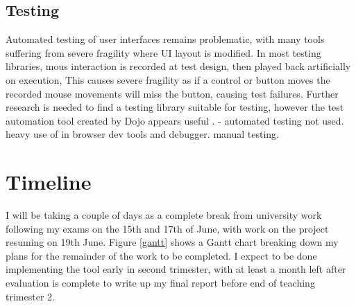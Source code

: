 \subsection{Testing}
Automated testing of user interfaces remains problematic, with many tools suffering from severe fragility where UI layout is modified. In most testing libraries, mous interaction is recorded at test design, then played back artificially on execution, This causes severe fragility as if a control or button moves the recorded mouse movements will miss the button, causing test failures. Further research is needed to find a testing library suitable for testing, however the test automation tool created by Dojo appears useful \cite{dojo2013test}. - automated testing not used. heavy use of in browser dev tools and debugger. manual testing. 

\section{Timeline}

I will be taking a couple of days as a complete break from university work following my exams on the 15th and 17th of June, with work on the project resuming on 19th June. Figure \ref{gantt} shows a Gantt chart breaking down my plans for the remainder of the work to be completed.  I expect to be done implementing the tool early in second trimester, with at least a month left after evaluation is complete to write up my final report before end of teaching trimester 2.
  
